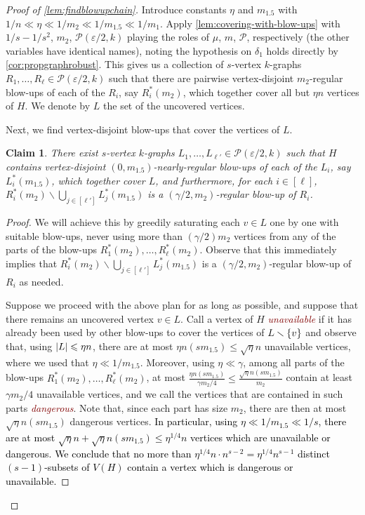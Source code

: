 \documentclass[12pt,reqno]{amsart}
\theoremstyle{plain}
\newtheorem{claim}[theorem]{Claim}
\theoremstyle{definition}
\numberwithin{equation}{section}
\newcommand{\fw}[1]{\textcolor{black}{#1}}
\DeclarePairedDelimiter{\abs}{\lvert}{\rvert}
\DeclarePairedDelimiter{\set}{\{}{\}}
\renewcommand{\le}{\leqslant}
\renewcommand{\leq}{\leqslant}
\renewcommand{\setminus}{\smallsetminus}
\newcommand{\defn}[1]{\textcolor{Maroon}{\emph{#1}}}
\newcommand{\eps}{\varepsilon}
\begin{document}
	\begin{proof}[Proof of \cref{lem:findblowupchain}]
		Introduce constants $\eta$ and $m_{1.5}$ with $1/n \ll \eta \ll 1/m_2 \ll 1/m_{1.5} \ll 1/m_1$. Apply \cref{lem:covering-with-blow-ups} with $1/s-1/s^2$, $m_2$, $\mathcal{P}(\eps/2, k)$ playing the roles of $\mu$, $m$, $\mathcal{P}$, respectively (the other variables have identical names), noting the hypothesis on $\delta_1$ holds directly by \cref{cor:propgraphrobust}. This gives us a collection of $s$-vertex $k$-graphs $R_1,\dotsc, R_\ell\in \mathcal{P}(\eps/2, k)$ such that there are pairwise vertex-disjoint $m_2$-regular blow-ups of each of the $R_i$, say $R_i^\ast(m_2)$, which together cover all but $\eta n$ vertices of $H$. We denote by $L$ the set of the uncovered vertices.
		
		Next, we find vertex-disjoint blow-ups that cover the vertices of $L$.
		\begin{claim}
			\label{claim:saturatingL}
			There exist $s$-vertex $k$-graphs $L_1,\dotsc, L_{\ell'}\in \mathcal{P}(\eps/2, k)$ such that $H$ contains vertex-disjoint $(0,m_{1.5})$-nearly-regular blow-ups of each of the $L_i$, say $L_i^\ast(m_{1.5})$, which together cover $L$, and furthermore, for each $i\in [\ell]$, $R_i^\ast(m_2)\setminus \bigcup_{j\in [\ell']} L_j^\ast(m_{1.5})$ is a $(\gamma/2, m_2)$-regular blow-up of $R_i$.
		\end{claim}
		\begin{proof}
			We will achieve this by greedily saturating each $v\in L$ one by one with suitable blow-ups, never using more than $(\gamma/2)m_2$ vertices from any of the parts of the blow-ups $R_1^\ast(m_2), \dots, R_{\ell}^\ast(m_2)$.
			Observe that this immediately implies that  $R_i^\ast(m_2)\setminus \bigcup_{j\in [\ell']} L_j^\ast(m_{1.5})$ is a $(\gamma/2, m_2)$-regular blow-up of $R_i$ as needed.
			
			Suppose we proceed with the above plan for as long as possible, and suppose that there remains an uncovered vertex $v\in L$.
			Call a vertex of $H$ \defn{unavailable} if it has already been used by other blow-ups to cover the vertices of $L\setminus \set{v}$ and observe that, using $\abs{L} \le \eta n$, there are at most $\eta n(sm_{1.5}) \leq \sqrt{\eta}n$ unavailable vertices, where we used that $\eta \ll 1/m_{1.5}$.
			Moreover, using $\eta \ll \gamma$, among all parts of the blow-ups $R_1^\ast(m_2), \dots, R_{\ell}^\ast(m_2)$, at most $\frac{\eta n (sm_{1.5})}{\gamma m_2/4} \le  \frac{\sqrt{\eta} n(sm_{1.5})}{m_2}$ contain at least $\gamma m_2/4$ unavailable vertices, and we call the vertices that are contained in such parts \defn{dangerous}.
			Note that, since each part has size $m_2$, there are then at most $\sqrt{\eta}n (sm_{1.5})$ dangerous vertices.
			\fw{In particular, using $\eta\ll 1/m_{1.5} \ll 1/s$, there are at most $\sqrt{\eta} n + \sqrt{\eta}n(sm_{1.5}) \le \eta^{1/4} n$ vertices which are unavailable or dangerous.}
			\fw{We conclude that no more than $\eta^{1/4} n \cdot n^{s-2} = \eta^{1/4} n^{s-1}$ distinct $(s-1)$-subsets of $V(H)$ contain a vertex which is dangerous or unavailable.}
			

\end{proof}
\end{proof}
\end{document}

